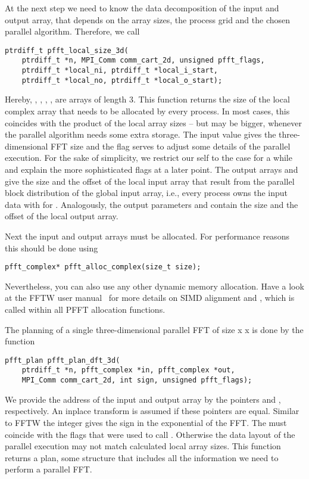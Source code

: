 At the next step we need to know the data decomposition of the input and output array, that depends on
the array sizes, the process grid and the chosen parallel algorithm. Therefore, we call
\begin{lstlisting}
ptrdiff_t pfft_local_size_3d(
    ptrdiff_t *n, MPI_Comm comm_cart_2d, unsigned pfft_flags,
    ptrdiff_t *local_ni, ptrdiff_t *local_i_start,
    ptrdiff_t *local_no, ptrdiff_t *local_o_start);
\end{lstlisting}
Hereby, , , , ,  are arrays of length $3$.
This function returns the size of the local complex array that needs to be allocated by every process.
In most cases, this coincides with the product of the local array sizes -- but may be bigger,
whenever the parallel algorithm needs some extra storage.
The input value  gives the three-dimensional FFT size and the flag  serves to adjust
some details of the parallel execution. For the sake of simplicity, we restrict our self to the case
 for a while and explain the more sophisticated flags at a later point.
The output arrays  and  give the size and the offset of the local input array
that result from the parallel block distribution of the global input array, i.e.,
every process owns the input data  with 
for . Analogously, the output parameters  and  contain the size
and the offset of the local output array.

Next the input and output arrays must be allocated. For performance reasons this should be done using
\begin{lstlisting}
pfft_complex* pfft_alloc_complex(size_t size);
\end{lstlisting}
Nevertheless, you can also use any other dynamic memory allocation. Have a look at the FFTW user manual~\cite{fftw-align-mem}
for more details on SIMD alignment and , which is called within all PFFT allocation functions.

The planning of a single three-dimensional parallel FFT of size  x  x 
is done by the function
\begin{lstlisting}
pfft_plan pfft_plan_dft_3d(
    ptrdiff_t *n, pfft_complex *in, pfft_complex *out,
    MPI_Comm comm_cart_2d, int sign, unsigned pfft_flags);
\end{lstlisting}
We provide the address of the input and output array by the pointers  and ,
respectively. An inplace transform is assumed if these pointers are equal. 
Similar to FFTW the integer  gives the sign in the exponential of the FFT.
The  must coincide with the flags that were used to call .
Otherwise the data layout of the parallel execution may not match calculated local array sizes.
This function returns a plan, some structure that includes all the information we need to perform a
parallel FFT.

